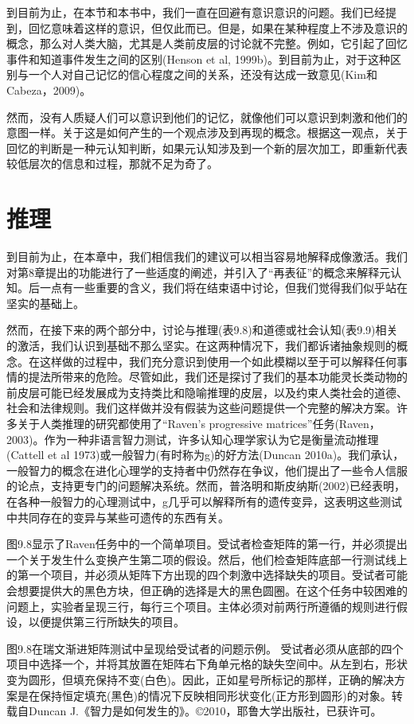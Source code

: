 到目前为止，在本节和本书中，我们一直在回避有意识意识的问题。我们已经提到，回忆意味着这样的意识，但仅此而已。但是，如果在某种程度上不涉及意识的概念，那么对人类大脑，尤其是人类前皮层的讨论就不完整。例如，它引起了回忆事件和知道事件发生之间的区别(Henson et al, 1999b)。到目前为止，对于这种区别与一个人对自己记忆的信心程度之间的关系，还没有达成一致意见(Kim和Cabeza，2009)。

然而，没有人质疑人们可以意识到他们的记忆，就像他们可以意识到刺激和他们的意图一样。关于这是如何产生的一个观点涉及到再现的概念。根据这一观点，关于回忆的判断是一种元认知判断，如果元认知涉及到一个新的层次加工，即重新代表较低层次的信息和过程，那就不足为奇了。

\section{推理}

到目前为止，在本章中，我们相信我们的建议可以相当容易地解释成像激活。我们对第8章提出的功能进行了一些适度的阐述，并引入了“再表征”的概念来解释元认知。后一点有一些重要的含义，我们将在结束语中讨论，但我们觉得我们似乎站在坚实的基础上。

然而，在接下来的两个部分中，讨论与推理(表9.8)和道德或社会认知(表9.9)相关的激活，我们认识到基础不那么坚实。在这两种情况下，我们都诉诸抽象规则的概念。在这样做的过程中，我们充分意识到使用一个如此模糊以至于可以解释任何事情的提法所带来的危险。尽管如此，我们还是探讨了我们的基本功能灵长类动物的前皮层可能已经发展成为支持类比和隐喻推理的皮层，以及约束人类社会的道德、社会和法律规则。我们这样做并没有假装为这些问题提供一个完整的解决方案。许多关于人类推理的研究都使用了“Raven’s progressive matrices”任务(Raven，2003)。作为一种非语言智力测试，许多认知心理学家认为它是衡量流动推理(Cattell et al 1973)或一般智力(有时称为g)的好方法(Duncan 2010a)。我们承认，一般智力的概念在进化心理学的支持者中仍然存在争议，他们提出了一些令人信服的论点，支持更专门的问题解决系统。然而，普洛明和斯皮纳斯(2002)已经表明，在各种一般智力的心理测试中，g几乎可以解释所有的遗传变异，这表明这些测试中共同存在的变异与某些可遗传的东西有关。

图9.8显示了Raven任务中的一个简单项目。受试者检查矩阵的第一行，并必须提出一个关于发生什么变换产生第二项的假设。然后，他们检查矩阵底部一行测试线上的第一个项目，并必须从矩阵下方出现的四个刺激中选择缺失的项目。受试者可能会想要提供大的黑色方块，但正确的选择是大的黑色圆圈。在这个任务中较困难的问题上，实验者呈现三行，每行三个项目。主体必须对前两行所遵循的规则进行假设，以便提供第三行所缺失的项目。

图9.8在瑞文渐进矩阵测试中呈现给受试者的问题示例。
受试者必须从底部的四个项目中选择一个，并将其放置在矩阵右下角单元格的缺失空间中。从左到右，形状变为圆形，但填充保持不变(白色)。因此，正如星号所标记的那样，正确的解决方案是在保持恒定填充(黑色)的情况下反映相同形状变化(正方形到圆形)的对象。转载自Duncan J.《智力是如何发生的》。©2010，耶鲁大学出版社，已获许可。

